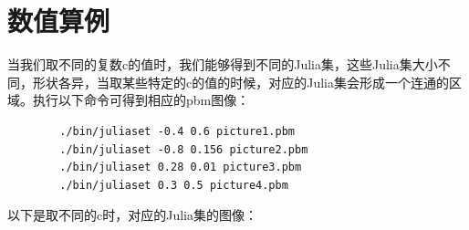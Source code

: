 \documentclass[UTF8,a4paper]{ctexart}
\begin{document}
	\section{数值算例}
	当我们取不同的复数c的值时，我们能够得到不同的Julia集，这些Julia集大小不同，形状各异，当取某些特定的c的值的时候，对应的Julia集会形成一个连通的区域。执行以下命令可得到相应的pbm图像：
	\begin{verbatim}
		./bin/juliaset -0.4 0.6 picture1.pbm
		./bin/juliaset -0.8 0.156 picture2.pbm
		./bin/juliaset 0.28 0.01 picture3.pbm
		./bin/juliaset 0.3 0.5 picture4.pbm
	\end{verbatim}
	以下是取不同的c时，对应的Julia集的图像：
	\begin{figure}[ht]
		\centering
	\end{figure}
\end{document}
